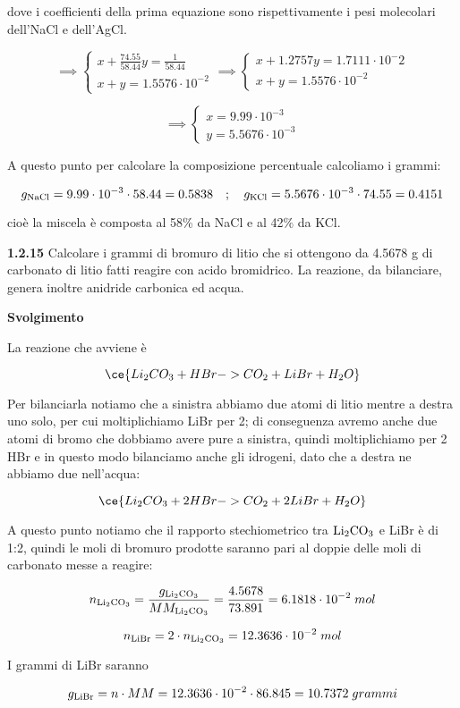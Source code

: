 dove i coefficienti della prima equazione sono rispettivamente i pesi molecolari dell'NaCl e dell'AgCl.

$$\implies
\begin{cases}
    x + \displaystyle \frac{74.55}{58.44}y=\displaystyle \frac{1}{58.44}\\[0.2cm]
    x+y=1.5576 \cdot 10^{-2}
\end{cases}
\implies
\begin{cases}
    x + 1.2757y=1.7111 \cdot 10^-2\\
    x+y=1.5576 \cdot 10^{-2}
\end{cases}$$

$$\implies
\begin{cases}
    x=9.99 \cdot 10^{-3}\\
    y=5.5676 \cdot 10^{-3}
\end{cases}$$

A questo punto per calcolare la composizione percentuale calcoliamo i grammi:

$$g_{\rm NaCl}=9.99 \cdot 10^{-3} \cdot 58.44
=0.5838
\quad;\quad
g_{\rm KCl}=5.5676 \cdot 10^{-3} \cdot 74.55
=0.4151$$

cioè la miscela è composta al 58\% da NaCl e al 42\% da KCl.

\vspace{0.2cm}\textbf{1.2.15} Calcolare i grammi di bromuro di litio che si ottengono da 4.5678 g di carbonato di litio fatti reagire con acido bromidrico. La reazione, da bilanciare, genera inoltre anidride carbonica ed acqua.

\vspace{0.2cm}\large\textbf{Svolgimento}\normalsize

\vspace{0.2cm}La reazione che avviene è

$$\ce{Li_2CO_3 + HBr -> CO_2 + LiBr + H_2O}$$

Per bilanciarla notiamo che a sinistra abbiamo due atomi di litio mentre a destra uno solo, per cui moltiplichiamo LiBr per 2; di conseguenza avremo anche due atomi di bromo che dobbiamo avere pure a sinistra, quindi moltiplichiamo per 2 HBr e in questo modo bilanciamo anche gli idrogeni, dato che a destra ne abbiamo due nell'acqua:

$$\ce{Li_2CO_3 + 2HBr -> CO_2 + 2LiBr + H_2O}$$

A questo punto notiamo che il rapporto stechiometrico tra $\rm Li_2CO_3$ e LiBr è di 1:2, quindi le moli di bromuro prodotte saranno pari al doppie delle moli di carbonato messe a reagire:

$$n_{\rm Li_2CO_3}
=\frac{g_{\rm Li_2CO_3}}{MM_{\rm Li_2CO_3}}
=\frac{4.5678}{73.891}=6.1818 \cdot 10^{-2}\;mol$$

$$n_{\rm LiBr}=2 \cdot n_{\rm Li_2CO_3}=12.3636 \cdot 10^{-2}\;mol$$

I grammi di LiBr saranno

$$g_{\rm LiBr}=n \cdot MM=12.3636 \cdot 10^{-2} \cdot 86.845
=10.7372\;grammi$$